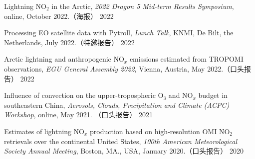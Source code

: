 

\begin{cvpublications}

\publication
{Lightning NO$_2$ in the Arctic,
\emph{2022 Dragon 5 Mid-term Results Symposium},
online, October 2022.（海报）} %
{2022} %

\publication
{Processing EO satellite data with Pytroll,
\emph{Lunch Talk},
KNMI, De Bilt, the Netherlands, July 2022.（特邀报告）} %
{2022} %

\publication
{Arctic lightning and anthropogenic NO$_x$ emissions estimated from TROPOMI observations,
\emph{EGU General Assembly 2022},
Vienna, Austria, May 2022.（口头报告）} %
{2022} %


\publication
{Influence of convection on the upper-tropospheric O$_3$ and NO$_x$ budget in southeastern China,
\emph{Aerosols, Clouds, Precipitation and Climate (ACPC) Workshop},
online, May 2021. （口头报告）} %
{2021} %


\publication
{Estimates of lightning NO$_x$ production based on high-resolution OMI NO$_2$ retrievals over the continental United States,
\emph{100th American Meteorological Society Annual Meeting},
Boston, MA., USA, January 2020.（口头报告）} %
{2020} %



\end{cvpublications}
